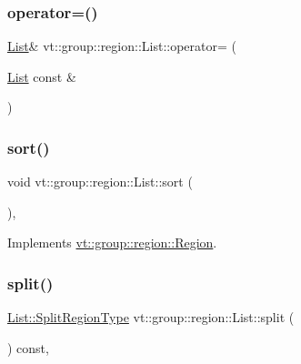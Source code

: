 \subsubsection{\texorpdfstring{operator=()}{operator=()}}
{\footnotesize\ttfamily \hyperlink{structvt_1_1group_1_1region_1_1_list}{List}\& vt\+::group\+::region\+::\+List\+::operator= (\begin{DoxyParamCaption}\item[{\hyperlink{structvt_1_1group_1_1region_1_1_list}{List} const \&}]{ }\end{DoxyParamCaption})\hspace{0.3cm}{\ttfamily [default]}}

\mbox{\label{structvt_1_1group_1_1region_1_1_list_acebca171776662bdf481ed1eb7ee4c09}} 
\subsubsection{\texorpdfstring{sort()}{sort()}}
{\footnotesize\ttfamily void vt\+::group\+::region\+::\+List\+::sort (\begin{DoxyParamCaption}{ }\end{DoxyParamCaption})\hspace{0.3cm}{\ttfamily [override]}, {\ttfamily [virtual]}}



Implements \hyperlink{structvt_1_1group_1_1region_1_1_region_a169304bf82a87ff958333595bed2603d}{vt\+::group\+::region\+::\+Region}.

\mbox{\label{structvt_1_1group_1_1region_1_1_list_a0f8352e79bb541ad17ea80843a363304}} 
\subsubsection{\texorpdfstring{split()}{split()}}
{\footnotesize\ttfamily \hyperlink{structvt_1_1group_1_1region_1_1_region_ab8d05c0978c7f38292a9ed5a15498a4b}{List\+::\+Split\+Region\+Type} vt\+::group\+::region\+::\+List\+::split (\begin{DoxyParamCaption}{ }\end{DoxyParamCaption}) const\hspace{0.3cm}{\ttfamily [override]}, {\ttfamily [virtual]}}



